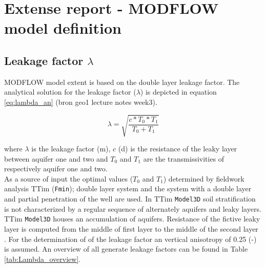 \chapter{Extense report - MODFLOW model definition}
\label{chapter:Extense_Modflow_model}

\section{Leakage factor $\lambda$}
\label{section:Leakage_factor}

MODFLOW model extent is based on the double layer leakage factor. The analytical solution for the leakage factor ($\lambda$) is depicted in equation \ref{eq:lambda_an} (bron geo1 lecture notes week3). 

\begin{equation}
 \lambda = \sqrt{\frac{c * T_0 * T_1}{T_0 + T_1}}
 \label{eq:lambda_an}
\end{equation}  

where $\lambda$ is the leakage factor (m), $c$ (d) is the resistance of the leaky layer between aquifer one and two and $T_0$ and $T_1$ are the transmissivities of respectively aquifer one and two. \\

As a source of input the optimal values ($T_0$ and $T_1$) determined by fieldwork analysis TTim (\texttt{Fmin}); double layer system and the system with a double layer and partial penetration of the well are used. In TTim \texttt{Model3D} soil stratification is not characterized by a regular sequence of alternately aquifers and leaky layers. TTim \texttt{Model3D} houses an accumulation of aquifers. Resistance of the fictive leaky layer is computed from the middle of first layer to the middle of the second layer \citep{Bakker2013,Mishra2013}. For the determination of of the leakage factor an vertical anisotropy of 0.25 (-) is assumed. An overview of all generate leakage factors can be found in Table \ref{tab:Lambda_overview}. \\

